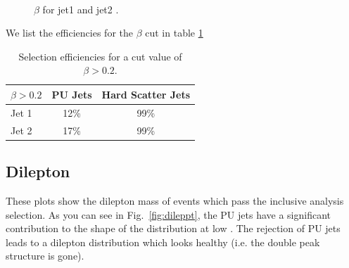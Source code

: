 \begin{figure}[!hbtp]
\centering
{}
\\
\caption{$\beta$ for jet1  and jet2 .}
\label{fig:jetbeta}
\end{figure}

We list the efficiencies for the $\beta$ cut in table \ref{table:efficiency}

\begin{table}[htb]
\begin{center}
\caption{\label{table:efficiency} Selection efficiencies for a cut value of $\beta > 0.2$. }
\begin{tabular}{l|cc}
\hline
\hline
$\beta > 0.2$ & PU Jets & Hard Scatter Jets \\
\hline
Jet 1 & 12\% & 99\% \\
Jet 2 & 17\% & 99\% \\
\hline
\hline
\end{tabular}
\end{center}
\end{table}

\subsection{Dilepton \pt}
These plots show the dilepton mass of events which pass the inclusive analysis selection. As you can see in Fig.~\ref{fig:dileppt}, the PU jets have a significant contribution to the shape of the distribution at low \pt. The rejection of PU jets leads to a dilepton \pt distribution which looks healthy (i.e. the double peak structure is gone). 


